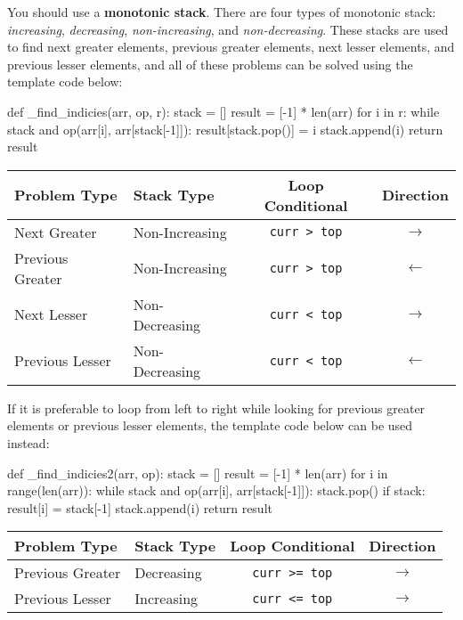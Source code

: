 \documentclass[12pt]{article}
\begin{document}
\begin{adjustwidth}{2em}{0pt}
You should use a \textbf{monotonic stack}. There are four types of monotonic stack: \textit{increasing}, \textit{decreasing}, \textit{non-increasing}, and \textit{non-decreasing}. These stacks are used to find next greater elements, previous greater elements, next lesser elements, and previous lesser elements, and all of these problems can be solved using the template code below: \medskip

\begin{python}
def _find_indicies(arr, op, r):
    stack = []
    result = [-1] * len(arr)
    for i in r:
        while stack and op(arr[i], arr[stack[-1]]):
            result[stack.pop()] = i
        stack.append(i)
    return result
\end{python} \medskip

\begin{center}
\begin{tabular}{|l|l|c|c|}
  \hline
  Problem Type & Stack Type & Loop Conditional & Direction \\
  \hline
  Next Greater & Non-Increasing & \texttt{curr > top} & $\rightarrow$ \\
  Previous Greater & Non-Increasing & \texttt{curr > top} & $\leftarrow$ \\
  Next Lesser & Non-Decreasing & \texttt{curr < top} & $\rightarrow$ \\
  Previous Lesser & Non-Decreasing & \texttt{curr < top} & $\leftarrow$ \\
  \hline
\end{tabular}
\end{center} \bigskip

If it is preferable to loop from left to right while looking for previous greater elements or previous lesser elements, the template code below can be used instead: \medskip

\begin{python}
def _find_indicies2(arr, op):
    stack = []
    result = [-1] * len(arr)
    for i in range(len(arr)):
        while stack and op(arr[i], arr[stack[-1]]):
            stack.pop()
        if stack:
            result[i] = stack[-1]
        stack.append(i)
    return result
\end{python} \medskip

\begin{center}
\begin{tabular}{|l|l|c|c|}
  \hline
  Problem Type & Stack Type & Loop Conditional & Direction \\
  \hline
  Previous Greater & Decreasing & \texttt{curr >= top} & $\rightarrow$ \\
  Previous Lesser & Increasing & \texttt{curr <= top} & $\rightarrow$ \\
  \hline
\end{tabular}
\end{center} \bigskip


\end{adjustwidth}
\end{document}

